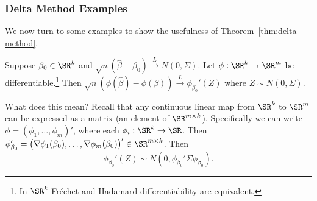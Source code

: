 \subsubsection{Delta Method Examples}%
\label{subsubsec:delta-method-examples}

We now turn to some examples to show the usefulness of Theorem~\ref{thm:delta-method}.
\begin{example}
	\label{ex:beta-hat-delta-method}
	Suppose \(\beta_0\in\SR^k\) and \( \sqrt{n}(\widehat\beta-\beta_0)\overset{L}{\to}N(0,\Sigma)\). Let \(\phi:\SR^k\to\SR^m\) be differentiable.\footnote{In \(\SR^k\) Fréchet and Hadamard differentiability are equivalent.} Then \(\sqrt{n}(\phi(\hat\beta)-\phi(\beta))\overset{L}{\to}\phi_{\beta_0}'(Z)\) where \(Z\sim N(0,\Sigma)\).

	What does this mean? Recall that any continuous linear map from \(\SR^k\) to \( \SR^m\) can be expressed as a matrix (an element of \(\SR^{m\times k}\)). Specifically we can write \(\phi = \left(\phi_1,\dots,\phi_m\right)'\), where each \(\phi_i:\SR^k\to \SR\). Then \(\phi'_{\beta_0} = \left(\nabla\phi_1(\beta_0),\dots,\nabla\phi_m(\beta_0)\right)' \in \SR^{m\times k}\). Then
	\[
		\phi_{\beta_0}'(Z) \sim N\left(0,\phi_{\beta_0}'\Sigma\phi_{\beta_0}\right)
	.\]
\end{example}
